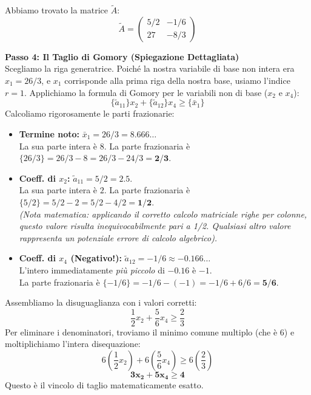 \documentclass[12pt, a4paper]{article}
\begin{document}
	Abbiamo trovato la matrice $\tilde{A}$:
	\[
	\tilde{A} = \begin{pmatrix} 5/2 & -1/6 \\ 27 & -8/3 \end{pmatrix}
	\]
	
	\vspace{0.4cm}
	\textbf{Passo 4: Il Taglio di Gomory (Spiegazione Dettagliata)}\\
	Scegliamo la riga generatrice. Poiché la nostra variabile di base non intera era $x_1 = 26/3$, e $x_1$ corrisponde alla prima riga della nostra base, usiamo l'indice $r=1$.
	Applichiamo la formula di Gomory per le variabili non di base ($x_2$ e $x_4$):
	\[
	\{\tilde{a}_{11}\} x_2 + \{\tilde{a}_{12}\} x_4 \geq \{\bar{x}_1\}
	\]
	Calcoliamo rigorosamente le parti frazionarie:
	\begin{itemize}[label=$\circ$, itemsep=4pt, leftmargin=1.5cm]
		\item \textbf{Termine noto:} $\bar{x}_1 = 26/3 = 8.666\dots$ \\
		La sua parte intera è $8$. La parte frazionaria è $\{26/3\} = 26/3 - 8 = 26/3 - 24/3 = \mathbf{2/3}$.
		
		\item \textbf{Coeff. di $x_2$:} $\tilde{a}_{11} = 5/2 = 2.5$. \\
		La sua parte intera è $2$. La parte frazionaria è $\{5/2\} = 5/2 - 2 = 5/2 - 4/2 = \mathbf{1/2}$. \\
		\textit{(Nota matematica: applicando il corretto calcolo matriciale righe per colonne, questo valore risulta inequivocabilmente pari a 1/2. Qualsiasi altro valore rappresenta un potenziale errore di calcolo algebrico).}
		
		\item \textbf{Coeff. di $x_4$ (Negativo!):} $\tilde{a}_{12} = -1/6 \approx -0.166\dots$ \\
		L'intero immediatamente \textit{più piccolo} di $-0.16$ è $-1$. \\
		La parte frazionaria è $\{-1/6\} = -1/6 - (-1) = -1/6 + 6/6 = \mathbf{5/6}$.
	\end{itemize}
	
	Assembliamo la disuguaglianza con i valori corretti:
	\[
	\frac{1}{2} x_2 + \frac{5}{6} x_4 \geq \frac{2}{3}
	\]
	Per eliminare i denominatori, troviamo il minimo comune multiplo (che è $6$) e moltiplichiamo l'intera disequazione:
	\[
	6 \left( \frac{1}{2} x_2 \right) + 6 \left( \frac{5}{6} x_4 \right) \geq 6 \left( \frac{2}{3} \right)
	\]
	\[
	\mathbf{3x_2 + 5x_4 \geq 4}
	\]
	Questo è il vincolo di taglio matematicamente esatto.
	
\end{document}
